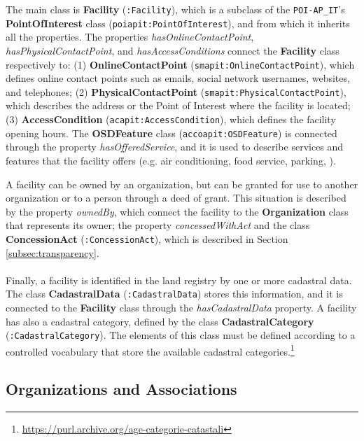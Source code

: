 The main class is \textbf{Facility} (\verb#:Facility#), which is a subclass of the \verb#POI-AP_IT#'s \textbf{PointOfInterest} class (\verb#poiapit:PointOfInterest#), and from which it inherits all the properties. The properties \textit{hasOnlineContactPoint}, \textit{hasPhysicalContactPoint}, and \textit{hasAccessConditions} connect the \textbf{Facility} class respectively to: (1) \textbf{OnlineContactPoint} (\verb#smapit:OnlineContactPoint#), which defines online contact points such as emails, social network usernames, websites, and telephones; (2) \textbf{PhysicalContactPoint} (\verb#smapit:PhysicalContactPoint#), which describes the address or the Point of Interest where the facility is located; (3) \textbf{AccessCondition} (\verb#acapit:AccessCondition#), which defines the facility opening hours. The \textbf{OSDFeature} class (\verb#accoapit:OSDFeature#) is connected through the property \textit{hasOfferedService}, and it is used to describe services and features that the facility offers (e.g. air conditioning, food service, parking, \etc).

A facility can be owned by an organization, but can be granted for use to another organization or to a person through a deed of grant. This situation is described by the property \textit{ownedBy}, which connect the facility to the \textbf{Organization} class that represents its owner; the property \textit{concessedWithAct} and the class \textbf{ConcessionAct} (\verb#:ConcessionAct#), which is described in Section \ref{subsec:transparency}.

\paragraph*{}
Finally, a facility is identified in the land registry by one or more cadastral data. The class \textbf{CadastralData} (\verb#:CadastralData#) stores this information, and it is connected to the \textbf{Facility} class through the \textit{hasCadastralData} property. A facility has also a cadastral category, defined by the class \textbf{CadastralCategory} (\verb#:CadastralCategory#). The elements of this class must be defined according to a controlled vocabulary that store the available cadastral categories.\footnote{\url{https://purl.archive.org/age-categorie-catastali}}

\subsection{Organizations and Associations}
\label{subsec:organizations-associations}

